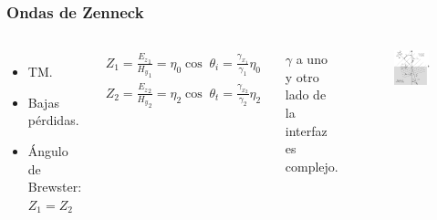 \documentclass{beamer}
\begin{document}
			\begin{frame}
			\frametitle{Ondas de Zenneck}
			
			\begin{columns}[c] %
				\begin{itemize}
					\item TM.
					\item Bajas pérdidas.
					\item Ángulo de Brewster: $Z_1 = Z_2$
				\end{itemize}
			
				
				\begin{align*}
				Z_1 = \frac{{E_z}_1}{{H_y}_1} = \eta_0 \cos\; \theta_i = \frac{\gamma_{x_1}}{\gamma_1} \eta_0\\
				Z_2 = \frac{{E_z}_2}{{H_y}_2} = \eta_2 \cos \; \theta_t = \frac{\gamma_{x_2}}{\gamma_2} \eta_2
				\end{align*}
				
				\begin{block}{}
					\centering
				$\gamma$ a uno y otro lado de la interfaz es complejo.
				\end{block}
			
				
				\begin{figure}
					\includegraphics[width=\textwidth]{intro_electro/onda-superficie-incidencia-brewster.pdf}
				\end{figure}
			\end{columns}
			
			\end{frame}
		
\end{document}
